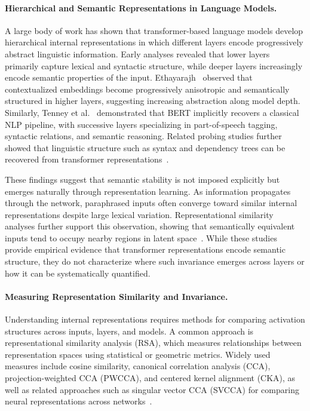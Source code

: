 \vspace{-1.0em}
\paragraph{Hierarchical and Semantic Representations in Language Models.} 
A large body of work has shown that transformer-based language models develop hierarchical internal representations in which different layers encode progressively abstract linguistic information. Early analyses revealed that lower layers primarily capture lexical and syntactic structure, while deeper layers increasingly encode semantic properties of the input. Ethayarajh~\cite{ethayarajh-2019-contextual} observed that contextualized embeddings become progressively anisotropic and semantically structured in higher layers, suggesting increasing abstraction along model depth. Similarly, Tenney et al.~\cite{tenney-etal-2019-bert} demonstrated that BERT implicitly recovers a classical NLP pipeline, with successive layers specializing in part-of-speech tagging, syntactic relations, and semantic reasoning. Related probing studies further showed that linguistic structure such as syntax and dependency trees can be recovered from transformer representations~\cite{hewitt-manning-2019,rogers-etal-2020}.

These findings suggest that semantic stability is not imposed explicitly but emerges naturally through representation learning. As information propagates through the network, paraphrased inputs often converge toward similar internal representations despite large lexical variation. Representational similarity analyses further support this observation, showing that semantically equivalent inputs tend to occupy nearby regions in latent space~\cite{bommasani-etal-2020-interpreting}. While these studies provide empirical evidence that transformer representations encode semantic structure, they do not characterize where such invariance emerges across layers or how it can be systematically quantified.

\vspace{-1.0em}
\paragraph{Measuring Representation Similarity and Invariance. }
Understanding internal representations requires methods for comparing activation structures across inputs, layers, and models. A common approach is representational similarity analysis (RSA), which measures relationships between representation spaces using statistical or geometric metrics. Widely used measures include cosine similarity, canonical correlation analysis (CCA), projection-weighted CCA (PWCCA), and centered kernel alignment (CKA), as well as related approaches such as singular vector CCA (SVCCA) for comparing neural representations across networks~\cite{raghu2017svcca}.

